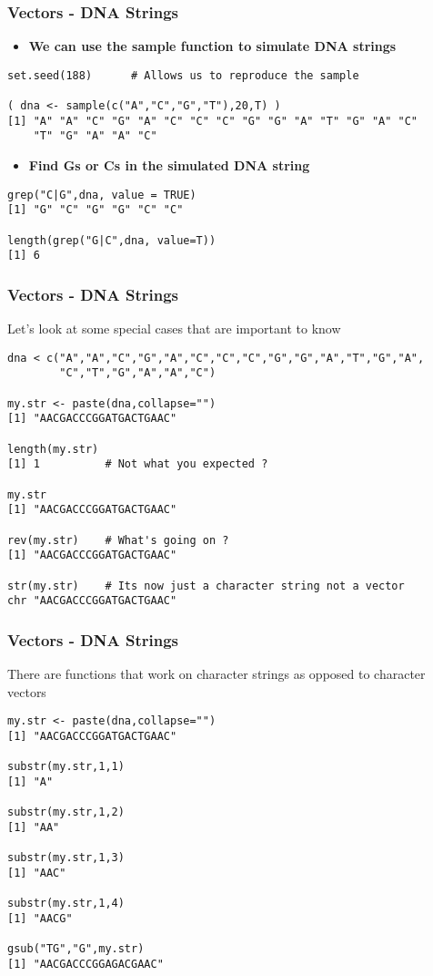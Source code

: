 \documentclass{beamer}
\begin{document}
\begin{frame}[fragile]
\frametitle{Vectors - DNA Strings}
\begin{itemize}
\item \textbf{We can use the sample function to simulate DNA strings} 
\end{itemize}
\footnotesize
\begin{verbatim}
set.seed(188)      # Allows us to reproduce the sample

( dna <- sample(c("A","C","G","T"),20,T) )
[1] "A" "A" "C" "G" "A" "C" "C" "C" "G" "G" "A" "T" "G" "A" "C" 
    "T" "G" "A" "A" "C"
\end{verbatim}

\normalsize
\begin{itemize}
\item \textbf{Find Gs or Cs in the simulated DNA string}
\end{itemize}

\footnotesize
\begin{verbatim}
grep("C|G",dna, value = TRUE)
[1] "G" "C" "G" "G" "C" "C"

length(grep("G|C",dna, value=T))
[1] 6
\end{verbatim}
\end{frame}

%

\begin{frame}[fragile]
\frametitle{Vectors - DNA Strings}
Let's look at some special cases that are important to know
\footnotesize
\begin{verbatim}
dna < c("A","A","C","G","A","C","C","C","G","G","A","T","G","A",
        "C","T","G","A","A","C")

my.str <- paste(dna,collapse="")
[1] "AACGACCCGGATGACTGAAC"

length(my.str)
[1] 1          # Not what you expected ?

my.str
[1] "AACGACCCGGATGACTGAAC"

rev(my.str)    # What's going on ?
[1] "AACGACCCGGATGACTGAAC"

str(my.str)    # Its now just a character string not a vector
chr "AACGACCCGGATGACTGAAC"
\end{verbatim}
\end{frame}

\begin{frame}[fragile]
\frametitle{Vectors - DNA Strings}
There are functions that work on character strings as opposed to character vectors
\footnotesize
\begin{verbatim}
my.str <- paste(dna,collapse="")
[1] "AACGACCCGGATGACTGAAC"

substr(my.str,1,1)
[1] "A"

substr(my.str,1,2)
[1] "AA"

substr(my.str,1,3)
[1] "AAC"

substr(my.str,1,4)
[1] "AACG"

gsub("TG","G",my.str)
[1] "AACGACCCGGAGACGAAC"
\end{verbatim}
\end{frame}
\end{document}
